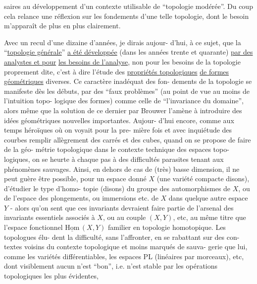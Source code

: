 
saires au développement d'un contexte utilisable de ``topologie
modérée''. Du coup cela relance une réflexion sur les fondements
d'une telle topologie, dont le besoin m'apparaît de plus en plus
clairement.

Avec un recul d'une dizaine d'années, je dirais aujour-%
d'hui, à ce sujet, que la ``\uline{topologie générale}'' \uline{a été développée}
(dans les années trente et quarante) \uline{par des analystes et pour}
\uline{les besoins de l'analyse}, non pour les besoins de la topologie
proprement dite, c'est à dire l'étude des \uline{propriétés topologiques}
\uline{de formes géométriques} diverses. Ce caractère inadéquat des fon-%
dements de la topologie se manifeste dès les débuts, par des
``faux problèmes'' (au point de vue au moins de l'intuition topo-%
logique des formes) comme celle de ``l'invariance du domaine'',
alors même que la solution de ce dernier par Brouwer l'amène à
introduire des idées géométriques nouvelles importantes. Aujour-%
d'hui encore, comme aux temps héroïques où on voyait pour la pre-%
mière fois et avec inquiétude des courbes remplir allègrement
des carrés et des cubes, quand on se propose de faire de la géo-%
métrie topologique dans le contexte technique des espaces topo-%
logiques, on se heurte à chaque pas à des difficultés parasites
tenant aux phénomènes sauvages. Ainsi, en dehors de cas de (très)
basse dimension, il ne peut guère être possible, pour un espace
donné $X$ (une variété compacte disons), d'étudier le type d'homo-%
topie (disons) du groupe des automorphismes de $X$, ou de l'espace
des plongements, ou immersions etc. de $X$ dans quelque autre
espace $Y$ - alors qu'on sent que ces invariants devraient faire
partie de l'arsenal des invariants essentiels associés à $X$, ou
au couple $(X,Y)$, etc, au même titre que l'espace fonctionnel
$\underline{\mathrm{Hom}}\,(X,Y)$ familier en topologie homotopique. Les topologues élu-%
dent la difficulté, sans l'affronter, en se rabattant sur des con-%
textes voisins du contexte topologique et moins marqués de sauva-%
gerie que lui, comme les variétés différentiables, les espaces PL
(linéaires par morceaux), etc, dont visiblement aucun n'est ``bon'',
i.e. n'est stable par les opérations topologiques les plus évidentes,


